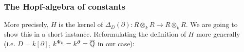 \subsubsection{The Hopf-algebra of constants}
More precisely, $H$ is the kernel of $\Delta_D(\partial) : R \otimes_k R \longrightarrow R \otimes_k R$. We are going to show this in a short instance. Reformulating the definition of $H$ more generally (i.e. $D = k[\partial]$, $k^{\Psi_k} = k^\partial = \overline{\mathbb{Q}}$ in our case):
